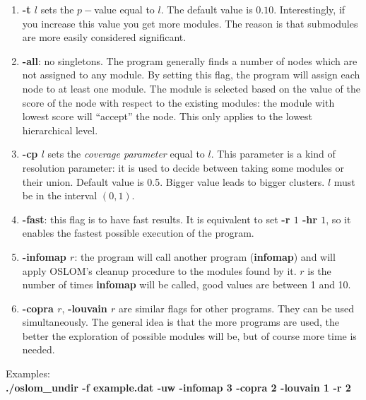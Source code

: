 \documentclass[11pt]{article}
\begin{document}
\begin{enumerate}
\item \textbf{-t $l$} sets the $p-$value equal to $l$. The default
  value is $0.10$. Interestingly, if you increase this value you get
  more modules. The reason is that submodules are more easily considered significant.

\item \textbf{-all}: no singletons. The program generally finds a
  number of nodes which are not assigned to any module. By setting this flag, the
  program will assign each node to at least one module.
  The module is selected based on the value of the score of the node
  with respect to the existing modules:
the module with lowest score will ``accept'' the node.  
This only applies to the lowest hierarchical level.
         
         
     \item \textbf{-cp $l$} sets the \textit{coverage parameter}  equal to $l$. This parameter is a kind of resolution parameter: it is used to decide between taking some modules or their union. Default value is 0.5. Bigger value leads to bigger clusters. $l$ must be in the interval $(0, 1)$.
  
      \item \textbf{-fast}: this flag is to have fast results. It is equivalent to set  \textbf{-r $1$ -hr $1$}, so it enables the fastest possible execution of the program.
   
   
     \item \textbf{-infomap $r$}: the program will call another program
     (\textbf{infomap}) and will apply OSLOM's cleanup procedure
     to the modules found by it. $r$ is the number of times \textbf{infomap} will be called, good values are between 1 and 10.
    
    
   \item \textbf{-copra $r$}, \textbf{-louvain $r$} are similar flags
     for other programs. They can be used simultaneously. The general
     idea is that the more programs are used, the better the
     exploration of possible modules will be, but of course more time is needed.
   
   
   
   
   
   \end{enumerate}
   
   
   
  
  
  Examples:
  \\
  
{ \textbf{./oslom\_undir  -f example.dat -uw -infomap 3 -copra 2 -louvain 1 -r 2 } }
  
\end{document}
